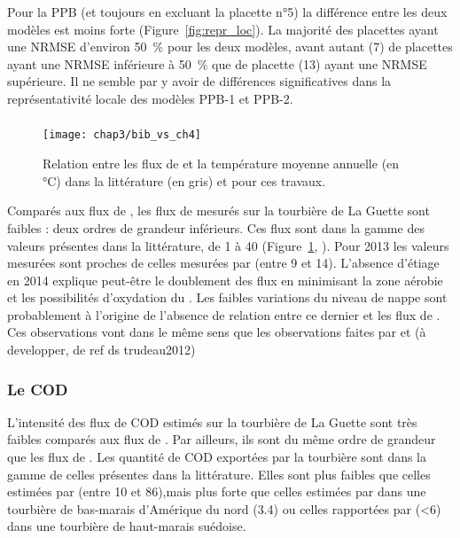 Pour la PPB (et toujours en excluant la placette n°5) la différence entre les deux modèles est moins forte (Figure~\ref{fig:repr_loc}).
La majorité des placettes ayant une NRMSE d'environ \SI{50}{\percent} pour les deux modèles, avant autant (7) de placettes ayant une NRMSE inférieure à \SI{50}{\percent} que de placette (13) ayant une NRMSE supérieure.
Il ne semble par y avoir de différences significatives dans la représentativité locale des modèles PPB-1 et PPB-2.




\subsubsection{\fchh}

\begin{figure}
\centering
\texttt{[image: chap3/bib\_vs\_ch4]}
\caption{Relation entre les flux de \chh  et la température moyenne annuelle (en °C) dans la littérature (en gris) et pour ces travaux.}
\label{fig:bib_vs_ch4}
\end{figure}

Comparés aux flux de \coo, les flux de \chh mesurés sur la tourbière de La Guette sont faibles : deux ordres de grandeur inférieurs.
Ces flux sont dans la gamme des valeurs présentes dans la littérature, de 1 à \SI{40}{\gcma} (Figure~\ref{fig:bib_vs_ch4},  \citep{nilsson2001}).
Pour 2013 les valeurs mesurées sont proches de celles mesurées par \citet{nilsson2008} (entre 9 et \SI{14}{\gcma}).
L'absence d'étiage en 2014 explique peut-être le doublement des flux en minimisant la zone aérobie et les possibilités d'oxydation du \chh \citep{lai2009}.
Les faibles variations du niveau de nappe sont probablement à l'origine de l'absence de relation entre ce dernier et les flux de \chh.
Ces observations vont dans le même sens que les observations faites par \citet{trudeau2012} et (à developper, de ref ds trudeau2012)


\subsubsection{Le COD}

L'intensité des flux de COD estimés sur la tourbière de La Guette sont très faibles comparés aux flux de \coo.
Par ailleurs, ils sont du même ordre de grandeur que les flux de \chh.
Les quantité de COD exportées par la tourbière sont dans la gamme de celles présentes dans la littérature.
Elles sont plus faibles que celles estimées par \citet{worrall2009} (entre 10 et \SI{86}{\gcma}),mais plus forte que celles estimées par \citet{carroll1997} dans une tourbière de bas-marais d’Amérique du nord (\SI{3.4}{\gcma}) ou celles rapportées par \citet{waddington2000} (<\SI{6}{\gcma}) dans une tourbière de haut-marais suédoise.

